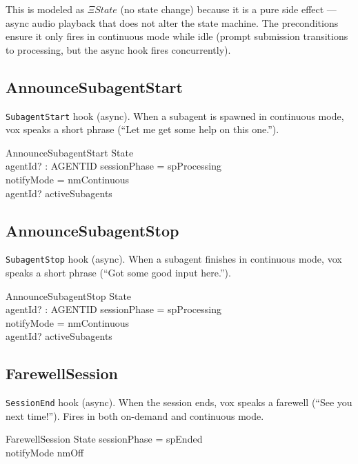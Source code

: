 \documentclass[a4paper,10pt,fleqn]{article}
\begin{document}
This is modeled as $\Xi State$ (no state change) because it is a
pure side effect --- async audio playback that does not alter the
state machine. The preconditions ensure it only fires in continuous
mode while idle (prompt submission transitions to processing, but
the async hook fires concurrently).

\subsection{AnnounceSubagentStart}

\texttt{SubagentStart} hook (async). When a subagent is spawned in
continuous mode, vox speaks a short phrase (``Let me get some help
on this one.'').

\begin{schema}{AnnounceSubagentStart}
  \Xi State \\
  agentId? : AGENTID
  \where
  sessionPhase = spProcessing \\
  notifyMode = nmContinuous \\
  agentId? \in activeSubagents
\end{schema}

\subsection{AnnounceSubagentStop}

\texttt{SubagentStop} hook (async). When a subagent finishes in
continuous mode, vox speaks a short phrase (``Got some good input
here.'').

\begin{schema}{AnnounceSubagentStop}
  \Xi State \\
  agentId? : AGENTID
  \where
  sessionPhase = spProcessing \\
  notifyMode = nmContinuous \\
  agentId? \notin activeSubagents
\end{schema}

\subsection{FarewellSession}

\texttt{SessionEnd} hook (async). When the session ends, vox speaks
a farewell (``See you next time!''). Fires in both on-demand and
continuous mode.

\begin{schema}{FarewellSession}
  \Xi State
  \where
  sessionPhase = spEnded \\
  notifyMode \neq nmOff
\end{schema}
\end{document}
